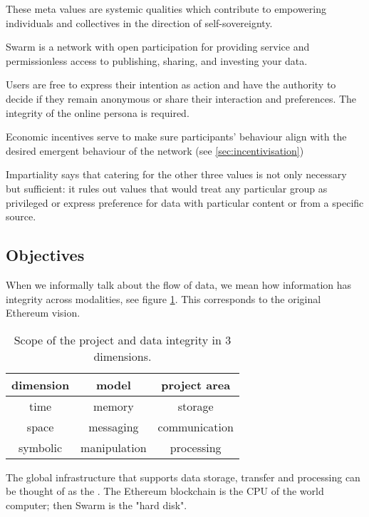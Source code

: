These meta values are systemic qualities which contribute to empowering individuals and collectives in the direction of self-sovereignty.

Swarm is a network with open participation for providing service and permissionless access to publishing, sharing, and investing your data.

Users are free to express their intention as action and have the authority to decide if they remain anonymous or share their interaction and preferences. The integrity of the online persona is required. 

Economic incentives serve to make sure participants' behaviour align with the desired emergent behaviour of the network (see \ref{sec:incentivisation}) 

Impartiality says that catering for the other three values is not only necessary but sufficient: it rules out values that would treat any particular group as privileged or express preference for data with particular content or from a specific source.

\subsection{Objectives}\label{sec:objectives}


When we informally talk about the flow of data, we mean how information has integrity across modalities, see figure \ref{tab:scope}. This corresponds to the original Ethereum vision.

\begin{table}[]
\centering
\begin{tabular}{c|c|c}
dimension & model & project area\\\hline
%
time & memory & storage \\
space & messaging & communication \\
symbolic & manipulation & processing \\
\end{tabular}
\caption{Scope of the project and data integrity in 3 dimensions.}
\label{tab:scope}
\end{table}

The global infrastructure that supports data storage, transfer and processing can be thought of as the . The Ethereum blockchain is the CPU of the world computer; then Swarm is the "hard disk".

